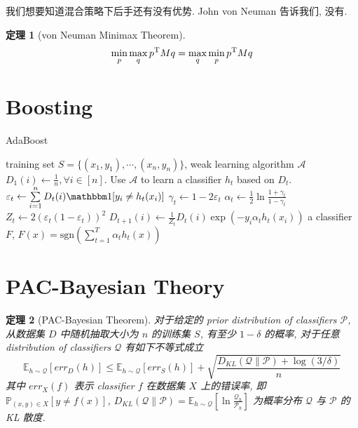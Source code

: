 \documentclass[8pt]{article}
\theoremstyle{compact}
\newtheorem{theorem}{定理}[section]
\def\le{\leqslant}
\begin{document}
我们想要知道混合策略下后手还有没有优势. John von Neuman 告诉我们, 没有.

\begin{theorem}[von Neuman Minimax Theorem]
	$$\min_{ p}\max_{ q}  p^{\text T}M q = \max_{ q}\min_{ p}  p^{\text T}M q$$
	\label{minimax}
\end{theorem}

\newpage
\section{Boosting}
\begin{algorithm}
	\caption{AdaBoost}
	\begin{algorithmic}[1]
		\Require training set $S = \{(x_1, y_1), \cdots, (x_n, y_n)\}$, weak learning algorithm $\mathcal A$
		\State $D_1(i) \gets \frac1n, \forall i \in [n]$.
			\State Use $\mathcal A$ to learn a classifier $h_t$ based on $D_t$.
			\State $\varepsilon_t \gets \sum\limits_{i=1}^{n}D_t(i)\mathbbm 1[y_i \neq h_t(x_i)]$
			\State $\gamma_t \gets 1 - 2\varepsilon_t$
			\State $\alpha_t \gets \frac12 \ln\frac{1 + \gamma_t}{1 - \gamma_t}$
			\State $Z_t \gets 2(\varepsilon_t (1 - \varepsilon_t))^2$
			\State $D_{t + 1}(i) \gets \frac{1}{Z_t}D_t(i)\exp(-y_i\alpha_th_t(x_i))$
		\EndFor
		\State \Return a classifier $F$, $F(x) = \text{sgn}\left(\sum\limits_{t=1}^{T}\alpha_th_t(x)\right)$
	\end{algorithmic}
\end{algorithm}



\newpage
\section{PAC-Bayesian Theory}
\begin{theorem}[PAC-Bayesian Theorem]
	对于给定的 prior distribution of classifiers $\mathcal P$, 从数据集 $D$ 中随机抽取大小为 $n$ 的训练集 $S$, 有至少 $1 - \delta$ 的概率, 对于任意 distribution of classifiers $\mathcal Q$ 有如下不等式成立
	$$\mathbb E_{h \sim \mathcal Q}[err_D(h)] \le \mathbb E_{h \sim \mathcal Q}[err_S(h)] + \sqrt{\frac{D_{KL}(\mathcal Q \| \mathcal P) + \log(3 / \delta)}{n}}$$
	其中 $err_{X}(f)$ 表示 classifier $f$ 在数据集 $X$ 上的错误率, 即 $\mathbb P_{(x, y) \in X}[y \neq f(x)]$, $D_{KL}(\mathcal Q \| \mathcal P) = \mathbb E_{h \sim \mathcal Q}\left[\ln \frac{\mathcal Q_h}{\mathcal P_h}\right]$ 为概率分布 $\mathcal Q$ 与 $\mathcal P$ 的 KL 散度.
	\label{PAC-Bayesian}
\end{theorem}
\end{document}

